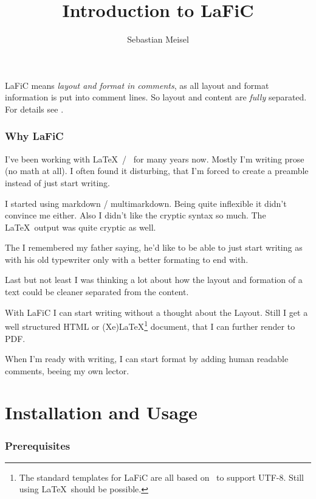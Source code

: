 \documentclass{article}
\title{Introduction to LaFiC}
\author{Sebastian Meisel}
\begin{document}
\maketitle


{LaFiC means \textit{layout and format in comments}, as all layout and
format information is put into comment lines. So layout and
content are \emph{fully} separated. For details see \xspace .\\}

\section{Why LaFiC}

{I've been working with \LaTeX\  / \XeLaTeX\  for many years
now. Mostly I'm writing prose (no math at all). I often
found it disturbing, that I'm forced to create a preamble
instead of just start writing.\\}

{I started using markdown / multimarkdown. Being quite
inflexible it didn't convince me either. Also I didn't like
the cryptic syntax so much. The \LaTeX\  output was quite
cryptic as well.\\}

{The I remembered my father saying, he'd like to be able to
just start writing as with his old typewriter only with a
better formating to end with.\\}

{Last but not least I was thinking a lot about how the layout
and formation of a text could be cleaner separated from the
content.\\}

{With LaFiC I can start writing without a thought about the
Layout. Still I get a well structured HTML or (Xe)LaTeX\footnote{The standard templates for LaFiC are all based on \XeLaTeX\  to support UTF-8. Still using \LaTeX\  should be possible.}\xspace 
document, that I can further render to PDF.\\}

{When I'm ready with writing, I can start format by
adding human readable comments, beeing my own lector.\\}

\part{Installation and Usage}

\section{Prerequisites}
\end{document}
